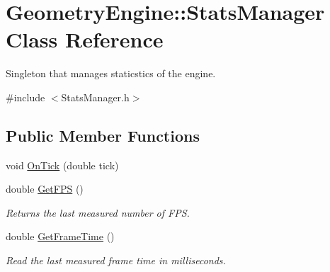 \hypertarget{class_geometry_engine_1_1_stats_manager}{}\section{Geometry\+Engine\+::Stats\+Manager Class Reference}
\label{class_geometry_engine_1_1_stats_manager}


Singleton that manages staticstics of the engine.  




{\ttfamily \#include $<$Stats\+Manager.\+h$>$}

\subsection*{Public Member Functions}
\begin{DoxyCompactItemize}
\item 
void \mbox{\hyperlink{class_geometry_engine_1_1_stats_manager_a6a890829fb4b7d459b3a4d9e03864dd9}{On\+Tick}} (double tick)
\item 
\mbox{\label{class_geometry_engine_1_1_stats_manager_ade8036883452fb26f29602899ad6f221}} 
double \mbox{\hyperlink{class_geometry_engine_1_1_stats_manager_ade8036883452fb26f29602899ad6f221}{Get\+F\+PS}} ()
\begin{DoxyCompactList}\small\item\em Returns the last measured number of F\+PS. \end{DoxyCompactList}\item 
\mbox{\label{class_geometry_engine_1_1_stats_manager_a58da2b7e3a2520e954ccb48e840edd92}} 
double \mbox{\hyperlink{class_geometry_engine_1_1_stats_manager_a58da2b7e3a2520e954ccb48e840edd92}{Get\+Frame\+Time}} ()
\begin{DoxyCompactList}\small\item\em Read the last measured frame time in milliseconds. \end{DoxyCompactList}\end{DoxyCompactItemize}
